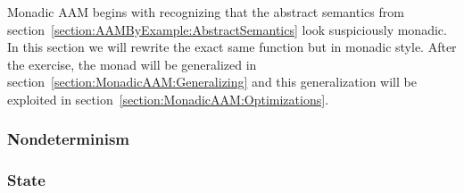 Monadic AAM begins with recognizing that the abstract semantics from
section~\ref{section:AAMByExample:AbstractSemantics} look suspiciously monadic.
%
In this section we will rewrite the exact same function but in monadic style.
%
After the exercise, the monad will be generalized in
section~\ref{section:MonadicAAM:Generalizing} and this generalization will be
exploited in section~\ref{section:MonadicAAM:Optimizations}.

\subsubsection{Nondeterminism}


\subsubsection{State}

